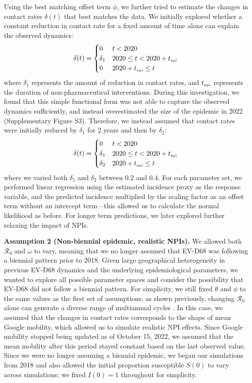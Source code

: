 \documentclass[12pt]{article}
\newcommand{\tsub}[2]{#1_{{\textrm{\tiny #2}}}}
\begin{document}
Using the best matching offset term $\phi$, we further tried to estimate the changes in contact rates $\delta(t)$ that best matches the data.
We initially explored whether a constant reduction in contact rate for a fixed amount of time alone can explain the observed dynamics:
\begin{equation}
\delta(t) = \begin{cases}
0 & t < 2020\\
\delta_1 & 2020 \leq t < 2020 + \tsub{t}{npi} \\
0 & 2020 + \tsub{t}{npi} \leq t
\end{cases}
\end{equation}
where $\delta_1$ represents the amount of reduction in contact rates, and $\tsub{t}{npi}$ represents the duration of non-pharmaceutical interventions.
During this investigation, we found that this simple functional form was not able to capture the observed dynamics sufficiently, and instead overestimated the size of the epidemic in 2022 (Supplementary Figure S3).
Therefore, we instead assumed that contact rates were initially reduced by $\delta_1$ for 2 years and then by $\delta_2$:
\begin{equation}
\delta(t) = \begin{cases}
0 & t < 2020\\
\delta_1 & 2020 \leq t < 2020 + \tsub{t}{npi} \\
\delta_2 & 2020 + \tsub{t}{npi} \leq t
\end{cases}
\end{equation}
where we varied both $\delta_1$ and $\delta_2$ between 0.2 and 0.4.
For each parameter set, we performed linear regression using the estimated incidence proxy as the response variable, and the predicted incidence multiplied by the scaling factor as an offset term without an intercept term---this allowed us to calculate the normal likelihood as before.
For longer term predictions, we later explored further relaxing the impact of NPIs.

\textbf{Assumption 2 (Non-biennial epidemic, realistic NPIs).}
We allowed both $\mathcal R_0$ and $\omega$ to vary, meaning that we no longer assumed that EV-D68 was following a biennial pattern prior to 2018.
Given large geographical heterogeneity in previous EV-D68 dynamics and the underlying epidemiological parameters, we wanted to explore all possible parameter spaces and consider the possibility that EV-D68 did not follow a biennial pattern.
For simplicity, we still fixed $\theta$ and $\phi$ to the same values as the first set of assumptions;
as shown previously, changing $\mathcal R_0$ alone can generate a diverse range of multiannual cycles \citep{earn2000simple,park2021epidemiological}.
In this case, we assumed that the changes in contact rates corresponds to the shape of mean Google mobility, which allowed us to simulate realistic NPI effects.
Since Google mobility stopped being updated as of October 15, 2022, we assumed that the mean mobility after this period stayed constant based on the last observed value.
Since we were no longer assuming a biennial epidemic, we began our simulations from 2018 and also allowed the initial proportion susceptible $S(0)$ to vary across simulations; we fixed $I(0) = 1$ throughout for simplicity.
\end{document}
